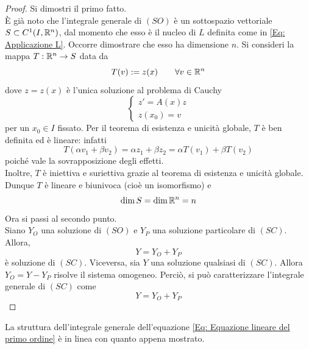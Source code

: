\begin{proof}
    Si dimostri il primo fatto.\\
    È già noto che l'integrale generale di $(SO)$ è un sottospazio vettoriale $S \subset C^1(I, \mathbb{R}^n)$, dal momento che esso è il nucleo di $L$ definita come in \eqref{Eq: Applicazione L}. Occorre dimostrare che esso ha dimensione $n$.
    Si consideri la mappa $T: \mathbb{R}^n\to S$ data da
    \begin{equation}
        T(v):=z(x) \qquad \forall v \in \mathbb{R}^n
    \end{equation}
    dove $z=z(x)$ è l'unica soluzione al problema di Cauchy \begin{equation}
        \begin{cases}    
        z'=A(x)z\\
        z(x_0)= v
        \end{cases}
    \end{equation}
    per un $x_0 \in I$ fissato. Per il teorema di esistenza e unicità globale, $T$ è ben definita ed è lineare: infatti
    \begin{equation}
        T(\alpha v_1 + \beta v_2)= \alpha z_1 + \beta z_2 = \alpha T(v_1)+ \beta T(v_2)
    \end{equation}
    poiché vale la sovrapposizione degli effetti.\\
    Inoltre, $T$ è iniettiva e suriettiva grazie al teorema di esistenza e unicità globale. Dunque $T$ è lineare e biunivoca (cioè un isomorfismo) e \begin{equation}
        \dim S = \dim \mathbb{R}^n = n
    \end{equation}
    Ora si passi al secondo punto.\\
    Siano $Y_O$ una soluzione di $(SO)$ e $Y_P$ una soluzione particolare di $(SC)$. Allora,
    \begin{equation}
        Y=Y_O+Y_P
    \end{equation}
    è soluzione di $(SC)$. Viceversa, sia $Y$ una soluzione qualsiasi di $(SC)$. Allora $Y_O=Y-Y_P$ risolve il sistema omogeneo. Perciò, si può caratterizzare l'integrale generale di $(SC)$ come 
    \begin{equation}
        Y=Y_O+Y_P
    \end{equation}
\end{proof} 
\begin{oss}
    La struttura dell'integrale generale dell'equazione \eqref{Eq: Equazione lineare del primo ordine} è in linea con quanto appena mostrato.
\end{oss}
